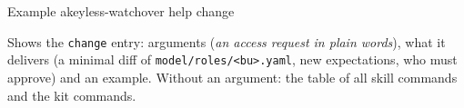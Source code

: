 \begin{session}{Example}
\you akeyless-watchover help change

\agent Shows the \texttt{change} entry: arguments (\emph{an access request in plain words}), what it
delivers (a minimal diff of \texttt{model/roles/<bu>.yaml}, new expectations, who must approve) and
an example. Without an argument: the table of all skill commands and the kit commands.
\end{session}

